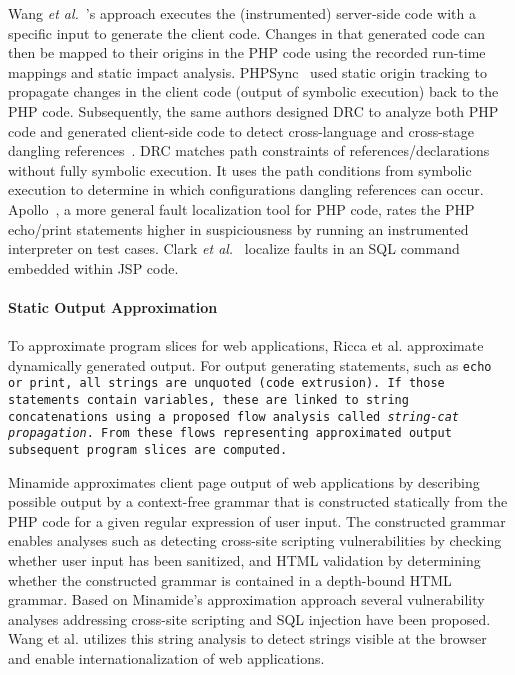 Wang {\em et al.}~\cite{wang-fse12}'s approach executes the
(instrumented) server-side code with a specific input to generate the
client code. Changes in that generated code can then be mapped to
their origins in the PHP code using the recorded run-time mappings and
static impact analysis.
%
PHPSync~\cite{phpsync} used static origin tracking to propagate
changes in the client code (output of symbolic execution) back to the
PHP code. Subsequently, the same authors designed DRC to analyze both
PHP code and generated client-side code to detect cross-language and
cross-stage dangling references~\cite{drc-ase13}. DRC matches path
constraints of references/declarations without fully symbolic
execution. It uses the path conditions from symbolic execution to
determine in which configurations dangling references can occur.
%
Apollo~\cite{artzi-icse10,artzi-tse10}, a more general fault
localization tool for PHP code, rates the PHP echo/print
statements higher in suspiciousness by running an instrumented
interpreter on test cases. Clark {\em et al.}~\cite{clark-ase11}
localize faults in an SQL command embedded within JSP code. 



\paragraph{Static Output Approximation}
To approximate program slices for web applications, Ricca et
al. \cite{tonella_web_2005,tonella_2001,tonella_2002} approximate
dynamically generated output. For output generating statements, such
as \tt{echo} or \tt{print}, all strings are unquoted (code
extrusion). If those statements contain variables, these are linked to
string concatenations using a proposed flow analysis called
\emph{string-cat propagation}. From these flows representing
approximated output subsequent program slices are computed.

Minamide \cite{minamide_static_2005} approximates client page output
of web applications by describing possible output by a context-free
grammar that is constructed statically from the PHP code for a given regular
expression of user input. The constructed grammar enables analyses such as
detecting cross-site scripting vulnerabilities by checking whether user input
has been sanitized, and HTML validation by determining whether the constructed
grammar is contained in a depth-bound HTML grammar. Based on Minamide's
approximation approach several vulnerability analyses addressing cross-site
scripting \cite{wassermann_static_2008} and SQL injection
\cite{wassermann2007sound} have been proposed. Wang et al.
\cite{wang_locating_2010} utilizes this string analysis to detect strings
visible at the browser and enable internationalization of web applications.
    

